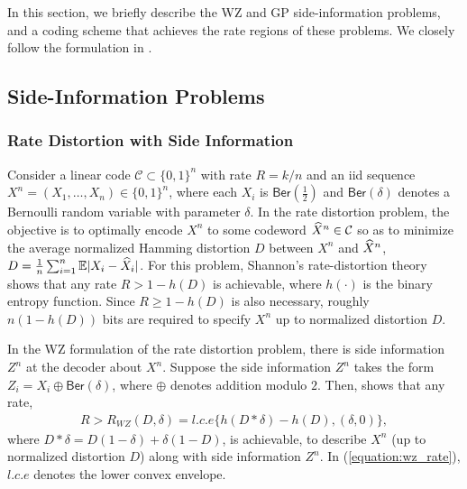 
\label{section:background}

In this section, we briefly describe the WZ and GP side-information problems, and a coding scheme that achieves the rate regions of these problems.
We closely follow the formulation in \cite{Wainwright-it09}.
\subsection{Side-Information Problems}

\subsubsection{Rate Distortion with Side Information}
Consider a linear code $\mathcal{C} \subset \{0,1\}^n$ with rate $R=k/n$ and an iid sequence $X^n = (X_1,\ldots,X_n) \in \{0,1 \}^n$, where each $X_i$ is $\mathsf{Ber}(\tfrac{1}{2})$ and $\mathsf{Ber}(\delta)$ denotes a Bernoulli random variable with parameter $\delta$.
In the rate distortion problem, the objective is to optimally encode $X^n$ to some codeword $\widehat{X}^n \in \mathcal{C}$ so as to minimize the average normalized Hamming distortion $D$ between $X^n$ and $\widehat{X}^n$, $D=\frac{1}{n} \sum_{i=1}^n \mathbb{E} |X_i - \widehat{X}_i|$.
For this problem, Shannon's rate-distortion theory \cite{Cover-2006} shows that any rate $R > 1 - h(D)$ is achievable, where $h(\cdot)$ is the binary entropy function.
Since $R \geq 1 - h(D)$ is also necessary, roughly $n(1-h(D))$ bits are required to specify $X^n$ up to normalized distortion $D$.

In the WZ formulation of the rate distortion problem, there is side information $Z^n$ at the decoder about $X^n$.
Suppose the side information $Z^n$ takes the form $Z_i = X_i \oplus \mathsf{Ber}(\delta)$, where $\oplus$ denotes addition modulo $2$.
Then, \cite{Wyner-it76} shows that any rate,
\begin{align}
  \label{equation:wz_rate}
  R > R_{WZ}(D,\delta) = l.c.e \{ h(D * \delta) - h(D) , (\delta,0) \},
\end{align}
where $D*\delta=D(1-\delta)+\delta(1-D)$, is achievable, to describe $X^n$ (up to normalized distortion $D$) along with side information $Z^n$.
In (\ref{equation:wz_rate}), $l.c.e$ denotes the lower convex envelope.

